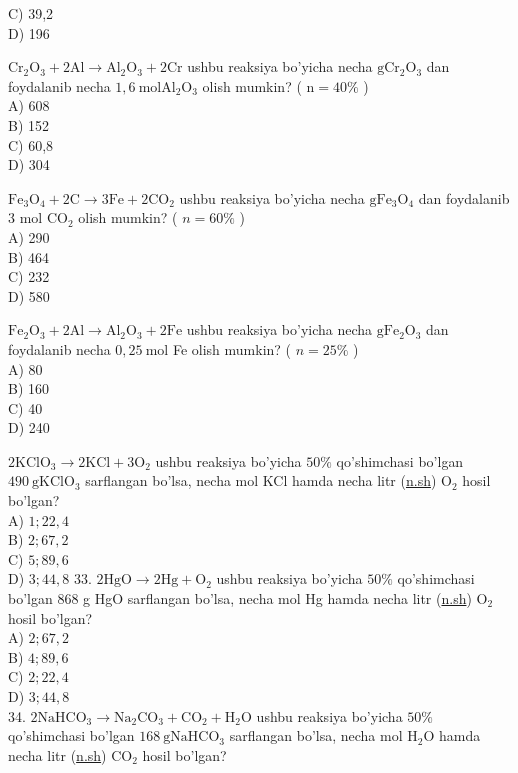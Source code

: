C) 39,2\\
D) 196
  \item $\mathrm{Cr}_{2} \mathrm{O}_{3}+2 \mathrm{Al} \rightarrow \mathrm{Al}_{2} \mathrm{O}_{3}+2 \mathrm{Cr}$ ushbu reaksiya bo'yicha necha $\mathrm{g} \mathrm{Cr}_{2} \mathrm{O}_{3}$ dan foydalanib necha $1,6 \mathrm{~mol} \mathrm{Al}_{2} \mathrm{O}_{3}$ olish mumkin? ( $\mathrm{n}=40 \%$ )\\
A) 608\\
B) 152\\
C) 60,8\\
D) 304
  \item $\mathrm{Fe}_{3} \mathrm{O}_{4}+2 \mathrm{C} \rightarrow 3 \mathrm{Fe}+2 \mathrm{CO}_{2}$ ushbu reaksiya bo'yicha necha $\mathrm{g} \mathrm{Fe}_{3} \mathrm{O}_{4}$ dan foydalanib 3 mol $\mathrm{CO}_{2}$ olish mumkin? ( $n=60 \%$ )\\
A) 290\\
B) 464\\
C) 232\\
D) 580
  \item $\mathrm{Fe}_{2} \mathrm{O}_{3}+2 \mathrm{Al} \rightarrow \mathrm{Al}_{2} \mathrm{O}_{3}+2 \mathrm{Fe}$ ushbu reaksiya bo'yicha necha $\mathrm{g} \mathrm{Fe}_{2} \mathrm{O}_{3}$ dan foydalanib necha $0,25 \mathrm{~mol}$ Fe olish mumkin? ( $n=25 \%$ )\\
A) 80\\
B) 160\\
C) 40\\
D) 240
  \item $2 \mathrm{KClO}_{3} \longrightarrow 2 \mathrm{KCl}+3 \mathrm{O}_{2}$ ushbu reaksiya bo'yicha $50 \%$ qo'shimchasi bo'lgan $490 \mathrm{~g} \mathrm{KClO}_{3}$ sarflangan bo'lsa, necha mol KCl hamda necha litr (\href{http://n.sh}{n.sh}) $\mathrm{O}_{2}$ hosil bo'lgan?\\
A) $1 ; 22,4$\\
B) $2 ; 67,2$\\
C) $5 ; 89,6$\\
D) $3 ; 44,8$
33. $2 \mathrm{HgO} \rightarrow 2 \mathrm{Hg}+\mathrm{O}_{2}$ ushbu reaksiya bo'yicha $50 \%$ qo'shimchasi bo'lgan 868 g HgO sarflangan bo'lsa, necha mol Hg hamda necha litr (\href{http://n.sh}{n.sh}) $\mathrm{O}_{2}$ hosil bo'lgan?\\
A) $2 ; 67,2$\\
B) $4 ; 89,6$\\
C) $2 ; 22,4$\\
D) $3 ; 44,8$\\
34. $2 \mathrm{NaHCO}_{3} \rightarrow \mathrm{Na}_{2} \mathrm{CO}_{3}+\mathrm{CO}_{2}+\mathrm{H}_{2} \mathrm{O}$ ushbu reaksiya bo'yicha $50 \%$ qo'shimchasi bo'lgan $168 \mathrm{~g} \mathrm{NaHCO}_{3}$ sarflangan bo'lsa, necha mol $\mathrm{H}_{2} \mathrm{O}$ hamda necha litr (\href{http://n.sh}{n.sh}) $\mathrm{CO}_{2}$ hosil bo'lgan?\\
